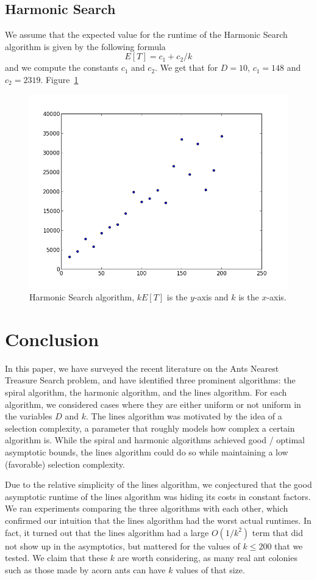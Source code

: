 \documentclass[runningheads,a4paper]{llncs}
\begin{document}
\subsection{Harmonic Search}

We assume that the expected value for the runtime of the Harmonic Search algorithm is given by the following formula
\[ E[T] = c_1 + c_2 / k \]
and we compute the constants $c_1$ and $c_2$. We get that for $D=10$, $c_1 = 148$ and $c_2 = 2319$. Figure~\ref{harmonic}

\begin{figure}
\centering
\label{harmonic}
\includegraphics[width=0.5\linewidth]{Harmonic.png}
\caption{Harmonic Search algorithm, $kE[T]$ is the $y$-axis and $k$ is the $x$-axis.}
\end{figure}

\section{Conclusion}
\label{conclusion}

In this paper, we have surveyed the recent literature on the Ants Nearest Treasure Search problem, and have identified three prominent algorithms: the spiral algorithm, the harmonic algorithm, and the lines algorithm. For each algorithm, we considered cases where they are either uniform or not uniform in the variables $D$ and $k$. The lines algorithm was motivated by the idea of a selection complexity, a parameter that roughly models how complex a certain algorithm is. While the spiral and harmonic algorithms achieved good / optimal asymptotic bounds, the lines algorithm could do so while maintaining a low (favorable) selection complexity.

Due to the relative simplicity of the lines algorithm, we conjectured that the good asymptotic runtime of the lines algorithm was hiding its costs in constant factors. We ran experiments comparing the three algorithms with each other, which confirmed our intuition that the lines algorithm had the worst actual runtimes. In fact, it turned out that the lines algorithm had a large $O(1/k^2)$ term that did not show up in the asymptotics, but mattered for the values of $k \leq 200$ that we tested. We claim that these $k$ are worth considering, as many real ant colonies such as those made by acorn ants can have $k$ values of that size.
\end{document}
